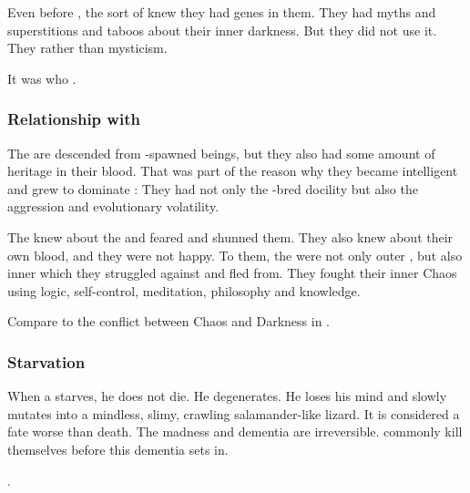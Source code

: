 Even before \Sethicus, the \ophidians sort of knew they had \xs genes in them. 
They had myths and superstitions and taboos about their inner darkness. 
But they did not use it.
They  rather than mysticism. 

It was \Sethicus who . 





\subsubsection{Relationship with \XzaiShanns}
The \ophidians{} are descended from \voyager-spawned beings, but they also had some amount of \xsic{} heritage in their blood. 
That was part of the reason why they became intelligent and grew to dominate \Miith{}: 
They had not only the \voyager-bred docility but also the \xsic{} aggression and evolutionary volatility. 

The \ophidians{} knew about the \xss{} and feared and shunned them. 
They also knew about their own \xsic{} blood, and they were not happy. 
To them, the \xss{} were not only outer \daemons, but also inner \daemons{} which they struggled against and fled from. 
They fought their inner Chaos using logic, self-control, meditation, philosophy and knowledge. 

Compare to the conflict between Chaos and Darkness in \cite{StevenEriksonIanCameronEsslemont:MalazanBookoftheFallen}. 





\subsubsection{Starvation}
When a \caisith starves, he does not die.
He degenerates.
He loses his mind and slowly mutates into a mindless, slimy, crawling salamander-like lizard. 
It is considered a fate worse than death.
The madness and dementia are irreversible. 
\Caisith commonly kill themselves before this dementia sets in. 

\Dragons {}.









